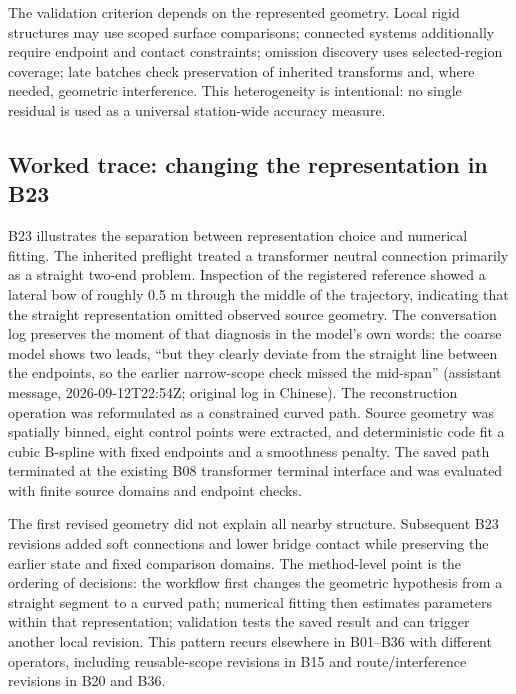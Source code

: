 \documentclass[10pt,a4paper]{article}
\begin{document}
The validation criterion depends on the represented geometry. Local
rigid structures may use scoped surface comparisons; connected systems
additionally require endpoint and contact constraints; omission
discovery uses selected-region coverage; late batches check preservation
of inherited transforms and, where needed, geometric interference. This
heterogeneity is intentional: no single residual is used as a universal
station-wide accuracy measure.

\hypertarget{worked-trace-changing-the-representation-in-b23}{%
\subsection{Worked trace: changing the representation in
B23}\label{worked-trace-changing-the-representation-in-b23}}

B23 illustrates the separation between representation choice and
numerical fitting. The inherited preflight treated a transformer neutral
connection primarily as a straight two-end problem. Inspection of the
registered reference showed a lateral bow of roughly 0.5 m through the
middle of the trajectory, indicating that the straight representation
omitted observed source geometry. The conversation log preserves the
moment of that diagnosis in the model's own words: the coarse model
shows two leads, ``but they clearly deviate from the straight line
between the endpoints, so the earlier narrow-scope check missed the
mid-span'' (assistant message, 2026-09-12T22:54Z; original log in
Chinese). The reconstruction operation was reformulated as a constrained
curved path. Source geometry was spatially binned, eight control points
were extracted, and deterministic code fit a cubic B-spline with fixed
endpoints and a smoothness penalty. The saved path terminated at the
existing B08 transformer terminal interface and was evaluated with
finite source domains and endpoint checks.

The first revised geometry did not explain all nearby structure.
Subsequent B23 revisions added soft connections and lower bridge contact
while preserving the earlier state and fixed comparison domains. The
method-level point is the ordering of decisions: the workflow first
changes the geometric hypothesis from a straight segment to a curved
path; numerical fitting then estimates parameters within that
representation; validation tests the saved result and can trigger
another local revision. This pattern recurs elsewhere in B01--B36 with
different operators, including reusable-scope revisions in B15 and
route/interference revisions in B20 and B36.
\end{document}
